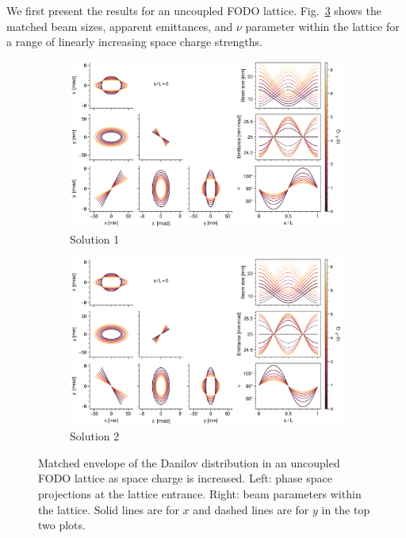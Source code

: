 We first present the results for an uncoupled FODO lattice. Fig.~\ref{fig:matched_vs_sc_fodo} shows the matched beam sizes, apparent emittances, and $\nu$ parameter within the lattice for a range of linearly increasing space charge strengths.
%
\begin{figure}[!p]
    \begin{subfigure}{1.0\textwidth}
        \includegraphics[width=\textwidth]{Images/chapter2/matched_vs_sc_fodo_mode1.png}
        \caption{Solution 1}
        \label{fig:matched_vs_sc_fodo_a}
    \end{subfigure}
    \vfill
    \vfill
    \begin{subfigure}{1.0\textwidth}
        \centering
        \includegraphics[width=\textwidth]{Images/chapter2/matched_vs_sc_fodo_mode2.png}
        \caption{Solution 2}
        \label{fig:matched_vs_sc_fodo_b}
    \end{subfigure}
    \caption{Matched envelope of the Danilov distribution in an uncoupled FODO lattice as space charge is increased. Left: phase space projections at the lattice entrance. Right: beam parameters within the lattice. Solid lines are for $x$ and dashed lines are for $y$ in the top two plots.}
    \label{fig:matched_vs_sc_fodo}
\end{figure}
